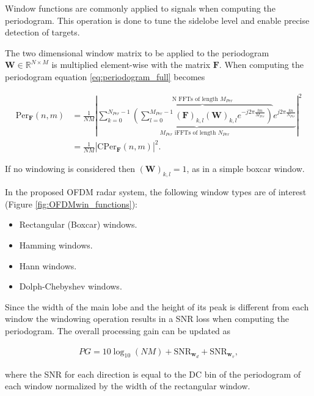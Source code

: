 	Window functions are commonly applied to signals when computing the periodogram. This operation is done to tune the sidelobe level and enable precise detection of targets. 
	
	
	The two dimensional window matrix to be applied to the periodogram $\bm{W} \in \mathbb{R}^{N\times M}$ is multiplied element-wise with the matrix $\bm{F}$. When computing the periodogram equation \ref{eq:periodogram_full} becomes
	
	
	   \begin{align}
		\text{Per}_{\bm{F}}(n,m) &= \frac{1}{NM} \left| \underbrace{ \sum_{k=0}^{N_{Per}-1}  \overbrace{\left( \sum_{l=0}^{M_{Per}-1} (\bm{F})_{k,l} (\bm{W})_{k,l} e^{-j2\pi \frac{lm}{M_{Per}}} \right)}^{\text{N FFTs of length $M_{Per}$}}  e^{j2\pi\frac{kn}{N_{Per}}}}_{ \text{$M_{Per}$ iFFTs of length $N_{Per}$ }} \right| ^ 2 \label{eq:periodogram_full_win}\\
		&= \frac{1}{NM} \left| \text{CPer}_{\bm{F}}(n,m) \right| ^ 2. \label{eq:periodogram_cper_win}
	\end{align}
	 
	 If no windowing is considered then $(\bm{W})_{k,l} = 1$, as in a simple boxcar window.
	 
	 In the proposed OFDM radar system, the following window types are of interest (Figure \ref{fig:OFDMwin_functions}):
	 
	 \begin{itemize}
	 	\item Rectangular (Boxcar) windows.
	 	\item Hamming windows.
	 	\item Hann windows.
	 	\item Dolph-Chebyshev windows.
	 \end{itemize}
	
	
	Since the width of the main lobe and the height of its peak is different from each window the windowing operation results in a SNR loss when computing the periodogram.
	The overall processing gain can be updated as
	
	\begin{align}
		PG = 10\log_{10}(NM) + \text{SNR}_{\bm{w}_d} + \text{SNR}_{\bm{w}_v},
	\end{align}
	
	where the SNR for each direction is equal to the DC bin of the periodogram of each window normalized by the width of the rectangular window.
	
